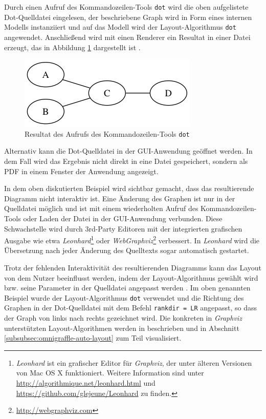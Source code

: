 

Durch einen Aufruf des Kommandozeilen-Tools \texttt{dot} wird die oben aufgelistete Dot-Quelldatei eingelesen, der beschriebene Graph wird in Form eines internen Modells instanziiert und auf das Modell wird der Layout-Algorithmus \texttt{dot} angewendet. Anschließend wird mit einen Renderer ein Resultat in einer Datei erzeugt, das in Abbildung \ref{fig:graphviz-dot-example} dargestellt ist \cite{Gansner14Using}.

\begin{figure}[hbt]
    \centering
    \includegraphics[scale=0.75]{resources/graphviz-dot-example.png}
    \caption{Resultat des Aufrufs des Kommandozeilen-Tools \texttt{dot}}
    \label{fig:graphviz-dot-example}
\end{figure}

Alternativ kann die Dot-Quelldatei in der GUI-Anwendung geöffnet werden. In dem Fall wird das Ergebnis nicht direkt in eine Datei gespeichert, sondern als PDF in einem Fenster der Anwendung angezeigt.

In dem oben diskutierten Beispiel wird sichtbar gemacht, dass das resultierende Diagramm nicht interaktiv ist. Eine Änderung des Graphen ist nur in der Quelldatei möglich und ist mit einem wiederholten Aufruf des Kommandozeilen-Tools oder Laden der Datei in der GUI-Anwendung verbunden. Diese Schwachstelle wird durch 3rd-Party Editoren mit der integrierten grafischen Ausgabe wie etwa \textit{Leonhard}\footnote{\textit{Leonhard} ist ein grafischer Editor für \textit{Graphviz}, der unter älteren Versionen von Mac OS X funktioniert. Weitere Information sind unter \url{http://algorithmique.net/leonhard.html} und \url{https://github.com/glejeune/Leonhard} zu finden.} oder \textit{WebGraphviz}\footnote{\url{http://webgraphviz.com}} verbessert. In \textit{Leonhard} wird die Übersetzung nach jeder Änderung des Quelltexts sogar automatisch gestartet.

Trotz der fehlenden Interaktivität des resultierenden Diagramms kann das Layout von dem Nutzer beeinflusst werden, indem der Layout-Algorithmus gewählt wird bzw. seine Parameter in der Quelldatei angepasst werden \cite{NorthGansner14Dot-Manual}. Im oben genannten Beispiel wurde der Layout-Algorithmus \texttt{dot} verwendet und die Richtung des Graphen in der Dot-Quelldatei mit dem Befehl \texttt{rankdir = LR} angepasst, so dass der Graph von links nach rechts gezeichnet wird. Die konkreten in \textit{Graphviz} unterstützten Layout-Algorithmen werden in \cite[S.22]{Gansner14Using} beschrieben und in Abschnitt \ref{subsubsec:omnigraffle-auto-layout} zum Teil visualisiert.

